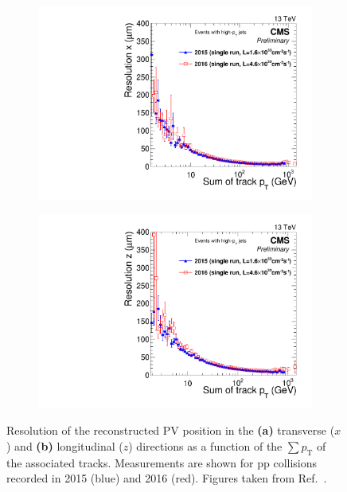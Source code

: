 \begin{figure}[h]
    \centering
    \begin{subfigure}[b]{0.49\textwidth}
        \centering
        \includegraphics[width=\textwidth]{Figures/Chapter4/resolution_sumpt_x.pdf}
        \caption{}
    \end{subfigure}
    \begin{subfigure}[b]{0.49\textwidth}
        \centering
        \includegraphics[width=\textwidth]{Figures/Chapter4/resolution_sumpt_z.pdf}
        \caption{}
    \end{subfigure}
\caption[Resolution of the reconstructed transverse and longitudinal positions of the primary vertex using CMS collision data (2015 \& 2016)]{Resolution of the reconstructed \ac{PV} position in the \textbf{(a)} transverse ($x$) and \textbf{(b)} longitudinal ($z$) directions as a function of the $\sum p_\mathrm{T}$ of the associated tracks. Measurements are shown for pp collisions recorded in 2015 (blue) and 2016 (red). Figures taken from Ref.~\cite{PrimaryVertex_Resolution}.}

\label{Figure:Chapter4_PrimaryVertex_Resolution}
\end{figure}

